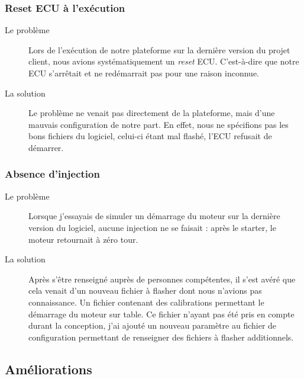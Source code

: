	\subsubsection{Reset ECU à l'exécution}
	\begin{description}
		\item[Le problème] Lors de l'exécution de notre plateforme sur la dernière version du projet client, nous avions systématiquement un \textit{reset} ECU. C'est-à-dire que notre ECU s'arrêtait et ne redémarrait pas pour une raison inconnue.
		\item[La solution] Le problème ne venait pas directement de la plateforme, mais d'une mauvais configuration de notre part. En effet, nous ne spécifions pas les bons fichiers du logiciel, celui-ci étant mal flashé, l'ECU refusait de démarrer.
	\end{description}
	
	\subsubsection{Absence d'injection}
	\begin{description}
		\item[Le problème] Lorsque j'essayais de simuler un démarrage du moteur sur la dernière version du logiciel, aucune injection ne se faisait : après le starter, le moteur retournait à zéro tour.
		\item[La solution] Après s'être renseigné auprès de personnes compétentes, il s'est avéré que cela venait d'un nouveau fichier à flasher dont nous n'avions pas connaissance. Un fichier contenant des calibrations permettant le démarrage du moteur sur table. Ce fichier n'ayant pas été pris en compte durant la conception, j'ai ajouté un nouveau paramètre au fichier de configuration permettant de renseigner des fichiers à flasher additionnels.
	\end{description}
	
\subsection{Améliorations}
